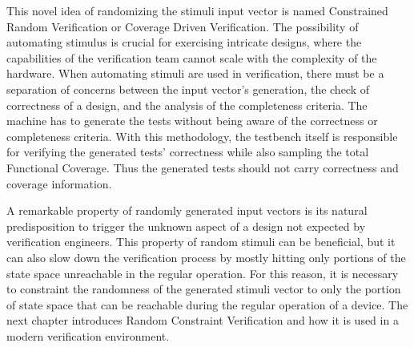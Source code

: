 This novel idea of randomizing the stimuli input vector is named Constrained
Random Verification or Coverage Driven Verification. The possibility of
automating stimulus is crucial for exercising intricate designs, where the
capabilities of the verification team cannot scale with the complexity of the
hardware. When automating stimuli are used in verification, there must be a
separation of concerns between the input vector's generation, the check of
correctness of a design, and the analysis of the completeness criteria. The
machine has to generate the tests without being aware of the correctness or
completeness criteria. With this methodology, the testbench itself is
responsible for verifying the generated tests' correctness while also sampling
the total Functional Coverage. Thus the generated tests should not carry
correctness and coverage information.
 
A remarkable property of randomly generated input vectors is its natural
predisposition to trigger the unknown aspect of a design not expected by
verification engineers. This property of random stimuli can be beneficial, but
it can also slow down the verification process by mostly hitting only portions
of the state space unreachable in the regular operation. For this reason, it is
necessary to constraint the randomness of the generated stimuli vector to only
the portion of state space that can be reachable during the regular operation of
a device. The next chapter introduces Random Constraint Verification and how it
is used in a modern verification environment.
